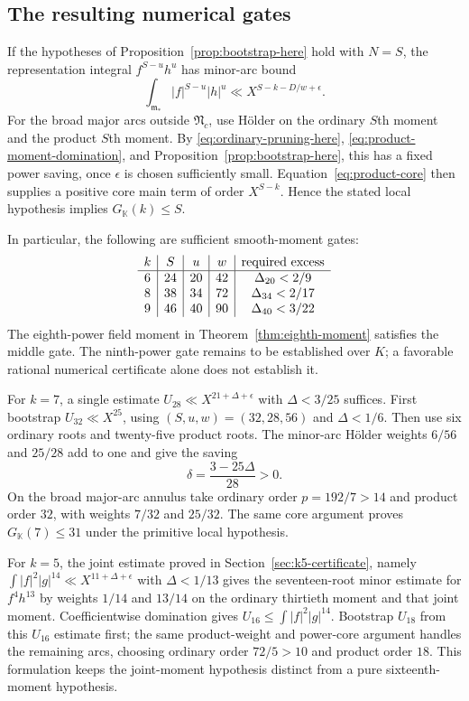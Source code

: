 \documentclass[11pt,reqno]{amsart}
\numberwithin{equation}{section}
\theoremstyle{definition}
\begin{document}
\subsection{The resulting numerical gates}
If the hypotheses of Proposition~\ref{prop:bootstrap-here} hold with $N=S$,
the representation integral $f^{S-u}h^u$ has minor-arc bound
\[
 \int_{\mathfrak m_*}|f|^{S-u}|h|^u
 \ll X^{S-k-D/w+\epsilon}.
\]
For the broad major arcs outside $\mathfrak N_c$, use H\"older on the ordinary
$S$th moment and the product $S$th moment.  By \eqref{eq:ordinary-pruning-here},
\eqref{eq:product-moment-domination}, and Proposition~\ref{prop:bootstrap-here},
this has a fixed power saving, once $\epsilon$ is chosen sufficiently small.
Equation~\eqref{eq:product-core} then supplies a positive core main term of
order $X^{S-k}$.  Hence the stated local hypothesis implies $G_{\mathbb K}(k)\le S$.

In particular, the following are sufficient smooth-moment gates:
\[
\begin{array}{c|c|c|c|c}
 k&S&u&w&\hbox{required excess}\\\hline
6&24&20&42&\Delta_{20}<2/9\\
8&38&34&72&\Delta_{34}<2/17\\
9&46&40&90&\Delta_{40}<3/22
\end{array}
\]
The eighth-power field moment in Theorem~\ref{thm:eighth-moment} satisfies
the middle gate. The ninth-power gate remains to be established over $K$;
a favorable rational numerical certificate alone does not establish it.

For $k=7$, a single estimate $U_{28}\ll X^{21+\Delta+\epsilon}$ with
$\Delta<3/25$ suffices.  First bootstrap $U_{32}\ll X^{25}$,
using $(S,u,w)=(32,28,56)$ and $\Delta<1/6$.
Then use six ordinary roots and twenty-five product roots.  The minor-arc
H\"older weights $6/56$ and $25/28$ add to one and give the saving
\[
 \delta=\frac{3-25\Delta}{28}>0.
\]
On the broad major-arc annulus take ordinary order $p=192/7>14$ and product
order $32$, with weights $7/32$ and $25/32$.
The same core argument proves $G_{\mathbb K}(7)\le31$ under the primitive local hypothesis.

For $k=5$, the joint estimate proved in Section~\ref{sec:k5-certificate}, namely
$\int|f|^2|g|^{14}\ll X^{11+\Delta+\epsilon}$ with $\Delta<1/13$
gives the seventeen-root minor estimate for $f^4h^{13}$ by weights
$1/14$ and $13/14$ on the ordinary thirtieth moment and that joint moment.
Coefficientwise domination gives $U_{16}\le\int|f|^2|g|^{14}$.
Bootstrap $U_{18}$ from this $U_{16}$ estimate first; the same product-weight and power-core
argument handles the remaining arcs, choosing ordinary order $72/5>10$
and product order $18$.  This formulation keeps the joint-moment hypothesis
distinct from a pure sixteenth-moment hypothesis.
\end{document}
